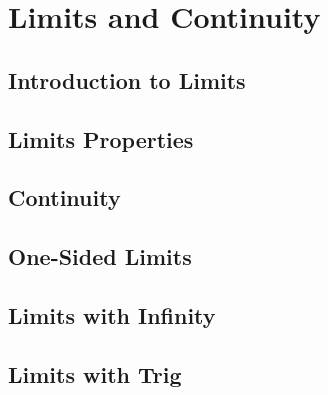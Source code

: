 \documentclass[../abcalc.tex]{subfiles}
\begin{document}
\chapter{Limits and Continuity}
\section{Introduction to Limits}
\section{Limits Properties}
\section{Continuity}
\section{One-Sided Limits}
\section{Limits with Infinity}
\section{Limits with Trig}
\end{document}
